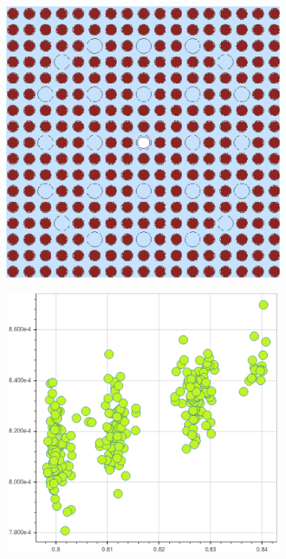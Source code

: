 \clearpage

\begin{figure}[h!]
\centering
\begin{subfigure}{0.42\textwidth}
  \centering
  \includegraphics[width=0.9\linewidth]{figures/unsupervised/features/assm-16/geometry}
  \caption{}
  \label{fig:chap10-capt-mean-std-geom}
\end{subfigure}%
\begin{subfigure}{0.42\textwidth}
  \centering
  \includegraphics[width=0.9\linewidth]{figures/unsupervised/features/assm-16/u238-capt/mean-std/mgxs}

\end{subfigure}
\end{figure}
